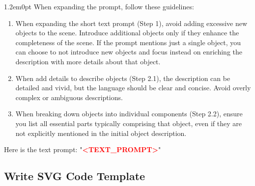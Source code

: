 \documentclass[10pt,a4paper]{article}
\newenvironment{bodytext}{\begin{adjustwidth}{1.2em}{0pt}}{\end{adjustwidth}}
\begin{document}
\begin{bodytext}
When expanding the prompt, follow these guidelines:
\begin{enumerate}
\item When expanding the short text prompt (Step 1), avoid adding excessive new objects to the scene. Introduce additional objects only if they enhance the completeness of the scene. If the prompt mentions just a single object, you can choose to not introduce new objects and focus instead on enriching the description with more details about that object.
\item When add details to describe objects (Step 2.1), the description can be detailed and vivid, but the language should be clear and concise. Avoid overly complex or ambiguous descriptions.
\item When breaking down objects into individual components (Step 2.2), ensure you list all essential parts typically comprising that object, even if they are not explicitly mentioned in the initial object description.
\end{enumerate}

Here is the text prompt: "\textcolor{red}{\textbf{<TEXT\_PROMPT>}}"
\end{bodytext}

\subsection{Write SVG Code Template}
\end{document}
